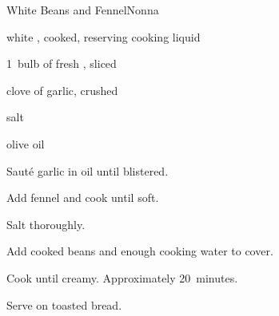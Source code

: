 \begin{recipe}{White Beans and Fennel}{Nonna}{}

\begin{ingredients}
\item {} white , cooked, reserving cooking liquid
\item 1~bulb of fresh , sliced
\item clove of garlic, crushed
\item salt
\item olive oil
\end{ingredients}

\begin{directions}
\item Saut\'e garlic in oil until blistered.
\item Add fennel and cook until soft.
\item Salt thoroughly.
\item Add cooked beans and enough cooking water to cover.
\item Cook until creamy. Approximately 20~minutes.
\item Serve on toasted bread.
\end{directions}

\end{recipe}
